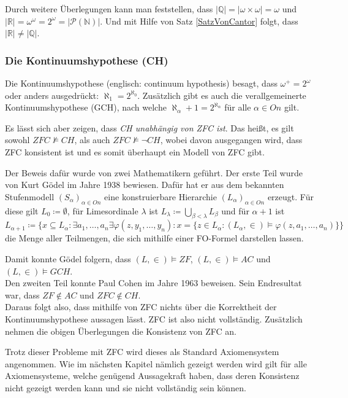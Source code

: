 \documentclass[german]{article}
\theoremstyle{break}
\theoremstyle{def_style}
\theoremstyle{def_style}
\theoremstyle{lemma_style}
\newcommand{\Pot}[1]{\mathcal{P}(#1)}
\begin{document}
Durch weitere Überlegungen kann man feststellen, dass $\vert \mathbb{Q} \vert=\vert \omega\times\omega \vert = \omega$ und $\vert \mathbb{R} \vert = \omega^\omega = 2^\omega=\vert \Pot{\mathbb{N}}\vert$. Und mit Hilfe von Satz \ref{SatzVonCantor} folgt, dass $\vert \mathbb{R} \vert \neq \vert \mathbb{Q} \vert$.

\subsubsection{Die Kontinuumshypothese (CH)}

Die Kontinuumshypothese (englisch: continuum hypothesis) besagt, dass $\omega^+=2^\omega$ oder anders ausgedrückt: $\aleph_1=2^{\aleph_0}$. Zusätzlich gibt es auch die verallgemeinerte Kontinuumshypothese (GCH), nach welche $\aleph_\alpha+1=2^{\aleph_\alpha}$ für alle $\alpha\in On$ gilt.
\par

Es lässt sich aber zeigen, dass \textit{CH unabhängig von ZFC ist}. Das heißt, es gilt sowohl $ZFC \not\models CH$, als auch $ZFC \not\models \neg CH$, wobei davon ausgegangen wird, dass ZFC konsistent ist und es somit überhaupt ein Modell von ZFC gibt.

Der Beweis dafür wurde von zwei Mathematikern geführt. Der erste Teil wurde von Kurt Gödel im Jahre 1938 bewiesen. Dafür hat er aus dem bekannten Stufenmodell $(S_\alpha)_{\alpha\in On}$ eine konstruierbare Hierarchie $(L_\alpha)_{\alpha\in On}$ erzeugt. Für diese gilt $L_0\coloneqq\emptyset$, für Limesordinale $\lambda$ ist $L_\lambda\coloneqq \bigcup_{\beta<\lambda}L_\beta$ und für $\alpha+1$ ist $L_{\alpha+1}\coloneqq\{x\subseteq L_\alpha : \exists a_1,\dots,a_n\exists\varphi(z,y_1,\dots,y_n) : x=\{z\in L_\alpha : (L_\alpha,\in) \models \varphi(z,a_1,\dots, a_n)\}\}$ die Menge aller Teilmengen, die sich mithilfe einer FO-Formel darstellen lassen.

Damit konnte Gödel folgern, dass $(L,\in)\models ZF$, $(L,\in)\models AC$ und $(L,\in)\models GCH$.
\\
Den zweiten Teil konnte Paul Cohen im Jahre 1963 beweisen. Sein Endresultat war, dass $ZF\notin AC$ und $ZFC \notin CH$.
\\

Daraus folgt also, dass mithilfe von ZFC nichts über die Korrektheit der Kontinuumshypothese aussagen lässt. ZFC ist also nicht vollständig. Zusätzlich nehmen die obigen Überlegungen die Konsistenz von ZFC an.

Trotz dieser Probleme mit ZFC wird dieses als \glqq Standard \grqq{} Axiomensystem angenommen. Wie im nächsten Kapitel nämlich gezeigt werden wird gilt für alle Axiomensysteme, welche genügend Aussagekraft haben, dass deren Konsistenz nicht gezeigt werden kann und sie nicht vollständig sein können.
\end{document}
